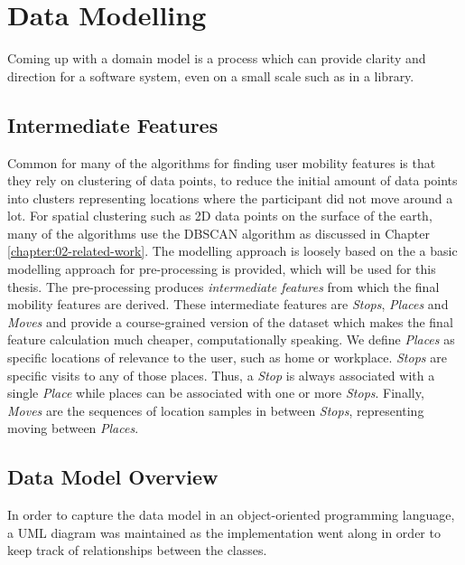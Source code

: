 \section{Data Modelling}
Coming up with a domain model is a process which can provide clarity and direction for a software system, even on a small scale such as in a library. 

\subsection{Intermediate Features}
Common for many of the algorithms for finding user mobility features is that they rely on clustering of data points, to reduce the initial amount of data points into clusters representing locations where the participant did not move around a lot. For spatial clustering such as 2D data points on the surface of the earth, many of the algorithms use the DBSCAN algorithm as discussed in Chapter \ref{chapter:02-related-work}. The modelling approach is loosely based on the \cite{sparse-location-2014} a basic modelling approach for pre-processing is provided, which will be used for this thesis. The pre-processing produces \textit{intermediate features} from which the final mobility features are derived. These intermediate features are \textit{Stops}, \textit{Places} and \textit{Moves} and provide a course-grained version of the dataset which makes the final feature calculation much cheaper, computationally speaking. We define \textit{Places} as specific locations of relevance to the user, such as home or workplace. \textit{Stops} are specific visits to any of those places. Thus, a \textit{Stop} is always associated with a single \textit{Place} while places can be associated with one or more \textit{Stops}. Finally, \textit{Moves} are the sequences of location samples in between \textit{Stops}, representing moving between \textit{Places}. 

\subsection{Data Model Overview}
In order to capture the data model in an object-oriented programming language, a UML diagram was maintained as the implementation went along in order to keep track of relationships between the classes. 

